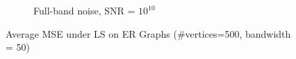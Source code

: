 \begin{figure}
\begin{subfigure}{0.3\columnwidth}
    \label{MSE_subfigb}%
    \end{subfigure}\hfill%
    \begin{subfigure}{0.3\columnwidth}
    \caption{Full-band noise, SNR = $10^{10}$}%
    \label{MSE_subfigc}%
    \end{subfigure}%
    \caption{Average MSE under LS on ER Graphs (\#vertices=500, bandwidth = 50) }
\label{LS_ER_MSE_fig}
\end{figure}




